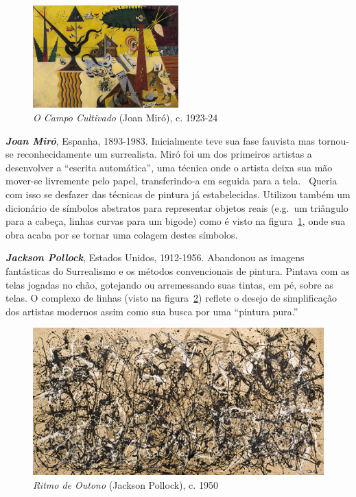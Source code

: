 \begin{figure}
  \vspace{-15pt}
  \begin{centering}
      \caption{\emph{O Campo Cultivado} (Joan Miró), c. 1923-24}
     \label{fig:miro:campo}
    \includegraphics[width=0.5\textwidth]{figs/miro_campo.png}
  \end{centering}
\end{figure}

\textbf{\emph{Joan Miró}}, Espanha, 1893-1983. Inicialmente teve sua fase
fauvista mas tornou-se reconhecidamente um surrealista. Miró foi um dos
primeiros artistas a desenvolver a ``escrita automática'', uma técnica onde o
artista deixa sua mão mover-se livremente pelo papel, transferindo-a em seguida
para a tela.~\cite{montagu} Queria com isso se desfazer das técnicas de pintura
já estabelecidas. Utilizou também um dicionário de símbolos abstratos para
representar objetos reais (e.g.\ um triângulo para a cabeça, linhas curvas para
um bigode) como é visto na figura~\ref{fig:miro:campo}, onde sua obra acaba por
se tornar uma colagem destes símbolos.~\cite{stich}

\textbf{\emph{Jackson Pollock}}, Estados Unidos, 1912-1956. Abandonou
as imagens fantásticas do Surrealismo e os métodos convencionais de
pintura. Pintava com as telas jogadas no chão, gotejando ou
arremessando suas tintas, em pé, sobre as telas. O complexo de linhas (visto na figura~\ref{fig:pollock:ritmo}) reflete
o desejo de simplificação dos artistas modernos assim como sua busca
por uma ``pintura pura.''~\cite{gombrich}

\begin{figure}[h!]
  \begin{center}
  \caption{\emph{Ritmo de Outono} (Jackson Pollock), c. 1950}
  \label{fig:pollock:ritmo}
    \includegraphics[scale=1.2]{figs/pollock_ritmo.png}
  \end{center}
\end{figure}

